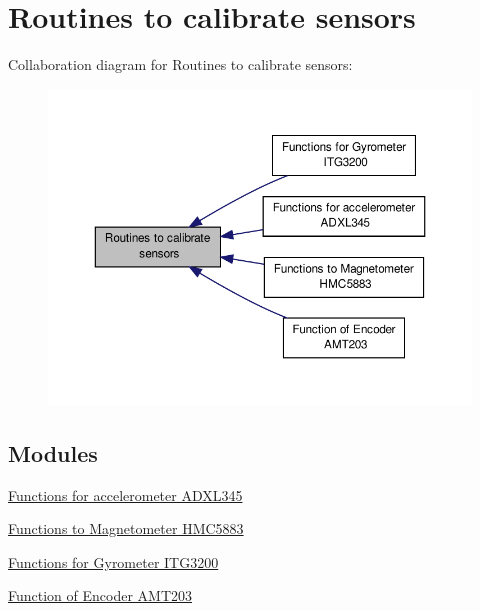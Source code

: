 \hypertarget{group__calibrate}{\section{Routines to calibrate sensors}
\label{group__calibrate}
}
Collaboration diagram for Routines to calibrate sensors\-:
\nopagebreak
\begin{figure}[H]
\begin{center}
\leavevmode
\includegraphics[width=350pt]{group__calibrate}
\end{center}
\end{figure}
\subsection*{Modules}
\begin{DoxyCompactItemize}
\item 
\hyperlink{group__acc}{Functions for accelerometer A\-D\-X\-L345}
\item 
\hyperlink{group__mag}{Functions to Magnetometer H\-M\-C5883}
\item 
\hyperlink{group__gyr}{Functions for Gyrometer I\-T\-G3200}
\item 
\hyperlink{group__enc}{Function of Encoder A\-M\-T203}
\end{DoxyCompactItemize}
